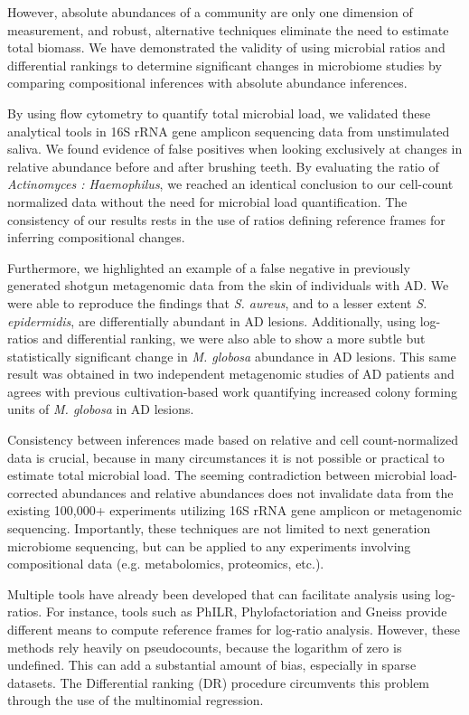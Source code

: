 However, absolute abundances of a community are only one dimension of measurement, and robust, alternative techniques eliminate the need to estimate total biomass. We have demonstrated the validity of using microbial ratios and differential rankings to determine significant changes in microbiome studies by comparing compositional inferences with absolute abundance inferences.

By using flow cytometry to quantify total microbial load, we validated these analytical tools in 16S rRNA gene amplicon sequencing data from unstimulated saliva. We found evidence of false positives when looking exclusively at changes in relative abundance before and after brushing teeth. By evaluating the ratio of \textit{Actinomyces : Haemophilus}, we reached an identical conclusion to our cell-count normalized data without the need for microbial load quantification. The consistency of our results rests in the use of ratios defining reference frames for inferring compositional changes.

Furthermore, we highlighted an example of a false negative in previously generated shotgun metagenomic data from the skin of individuals with AD. We were able to reproduce the findings that \textit{S. aureus}, and to a lesser extent \textit{S. epidermidis}, are differentially abundant in AD lesions. Additionally, using log-ratios and differential ranking, we were also able to show a more subtle but statistically significant change in \textit{M. globosa} abundance in AD lesions. This same result was obtained in two independent metagenomic studies of AD patients and agrees with previous cultivation-based work quantifying increased colony forming units of \textit{M. globosa} in AD lesions.

Consistency between inferences made based on relative and cell count-normalized data is crucial, because in many circumstances it is not possible or practical to estimate total microbial load. The seeming contradiction between microbial load-corrected abundances and relative abundances does not invalidate data from the existing 100,000+ experiments utilizing 16S rRNA gene amplicon or metagenomic sequencing\cite{Shi2018-xe,Gonzalez2018-rv}. Importantly, these techniques are not limited to next generation microbiome sequencing, but can be applied to any experiments involving compositional data (e.g. metabolomics, proteomics, etc.).

Multiple tools have already been developed that can facilitate analysis using log-ratios. For instance, tools such as PhILR, Phylofactoriation and Gneiss provide different means to compute reference frames for log-ratio analysis. However, these methods rely heavily on pseudocounts, because the logarithm of zero is undefined. This can add a substantial amount of bias, especially in sparse datasets. The Differential ranking (DR) procedure circumvents this problem through the use of the multinomial regression.

